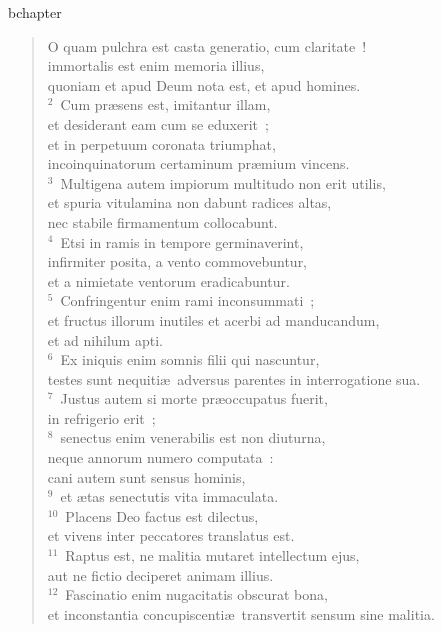 bchapter\begin{verse}\vspace{-19pt}O quam pulchra est casta generatio, cum claritate~!\\ immortalis est enim memoria illius,\\ quoniam et apud Deum nota est, et apud homines.\\
${}^{2}$~Cum pr\ae sens est, imitantur illam,\\ et desiderant eam cum se eduxerit~;\\ et in perpetuum coronata triumphat,\\ incoinquinatorum certaminum pr\ae mium vincens.\\
${}^{3}$~Multigena autem impiorum multitudo non erit utilis,\\ et spuria vitulamina non dabunt radices altas,\\ nec stabile firmamentum collocabunt.\\
${}^{4}$~Etsi in ramis in tempore germinaverint,\\ infirmiter posita, a vento commovebuntur,\\ et a nimietate ventorum eradicabuntur.\\
${}^{5}$~Confringentur enim rami inconsummati~;\\ et fructus illorum inutiles et acerbi ad manducandum,\\ et ad nihilum apti.\\
${}^{6}$~Ex iniquis enim somnis filii qui nascuntur,\\ testes sunt nequiti\ae\ adversus parentes in interrogatione sua.\\
${}^{7}$~Justus autem si morte pr\ae occupatus fuerit,\\ in refrigerio erit~;\\
${}^{8}$~senectus enim venerabilis est non diuturna,\\ neque annorum numero computata~:\\ cani autem sunt sensus hominis,\\
${}^{9}$~et \ae tas senectutis vita immaculata.\\
${}^{10}$~Placens Deo factus est dilectus,\\ et vivens inter peccatores translatus est.\\
${}^{11}$~Raptus est, ne malitia mutaret intellectum ejus,\\ aut ne fictio deciperet animam illius.\\
${}^{12}$~Fascinatio enim nugacitatis obscurat bona,\\ et inconstantia concupiscenti\ae\ transvertit sensum sine malitia.\\

\end{verse}
